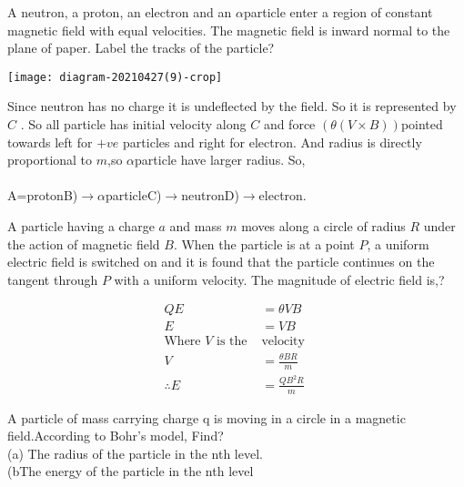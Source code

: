 	
	
\begin{exercise}
	A neutron, a proton, an electron and an $\alpha$particle enter a region of constant magnetic field with equal velocities. The magnetic field is inward normal to the plane of paper. Label the tracks of the particle?\\
	\begin{minipage}{.45\textwidth}
		\begin{center}
			\texttt{[image: diagram-20210427(9)-crop]}
		\end{center}
	\end{minipage}
\end{exercise}
\begin{answer}
	Since neutron has no charge it is undeflected by the field. So it is represented by $C$ . So all particle has initial velocity along $C$ and force $( \theta(V\times B))$pointed towards left for $+ve$ particles and right for electron. And radius is directly proportional to $m$,so $\alpha$particle have larger radius. So,\\\\
	A=proton\quad B)$\rightarrow$$\alpha$particle\quad C)$\rightarrow$neutron\quad D)$\rightarrow$electron.
\end{answer}
\begin{exercise}
	A particle having a charge $a$ and mass $m$ moves along a circle of radius $R$ under the action of magnetic field $B$. When the particle is at a point $P$, a uniform electric field is switched on and it is found that the particle continues on the tangent through $P$ with a uniform velocity. The magnitude of electric field is,?
\end{exercise}
\begin{answer}
	\begin{align*}
	Q E&=\theta VB\\
	E&=VB\\
	\text{Where $V$ is the }&\text{velocity }\\
	 V&=\frac{\theta BR}{m}\\
	\therefore E&=\frac{QB^2R}{m}
	\end{align*}
\end{answer}
\begin{exercise}
	A particle of mass carrying charge q is moving in a circle in a magnetic field.According to Bohr's model, Find?\\
	(a) The radius of the particle in the nth level.\\
	(bThe energy of the particle in the nth level
\end{exercise}
